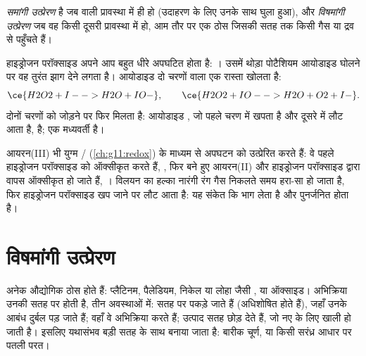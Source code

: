 \begin{definition}[समांगी और विषमांगी उत्प्रेरण]\label{def:g12:catalysis:homogeneous}
 \emph{समांगी उत्प्रेरण} है
जब   वाली प्रावस्था में ही हो (उदाहरण के लिए
उनके साथ घुला हुआ), और \emph{विषमांगी उत्प्रेरण}
जब वह किसी दूसरी प्रावस्था में हो, आम तौर पर एक ठोस जिसकी सतह तक
 किसी गैस या द्रव से पहुँचते हैं।
\end{definition}

\begin{example}[आयोडाइड आयन और हाइड्रोजन परॉक्साइड]\label{ex:g12:catalysis:iodide}
हाइड्रोजन परॉक्साइड अपने आप बहुत धीरे अपघटित होता है:
। उसमें थोड़ा पोटैशियम आयोडाइड घोलने पर
वह तुरंत झाग देने लगता है। आयोडाइड  दो चरणों वाला एक रास्ता खोलता है:
\[
  \ce{H2O2 + I- -> H2O + IO-}, \qquad
  \ce{H2O2 + IO- -> H2O + O2 + I-} .
\]
दोनों चरणों को जोड़ने पर फिर  मिलता है: आयोडाइड ,
जो पहले चरण में खपता है और दूसरे में लौट आता है,  है;
  एक मध्यवर्ती है।
\end{example}


\begin{example}\label{ex:g12:catalysis:iron}
आयरन(III)  भी युग्म
/ (\cref{ch:g11:redox}) के माध्यम से अपघटन को उत्प्रेरित करते हैं: वे पहले
हाइड्रोजन परॉक्साइड को ऑक्सीकृत करते हैं, , फिर
बने हुए आयरन(II)  और हाइड्रोजन परॉक्साइड द्वारा वापस ऑक्सीकृत हो जाते हैं,
। विलयन का हल्का नारंगी रंग
गैस निकलते समय हरा-सा हो जाता है, फिर हाइड्रोजन परॉक्साइड खप जाने पर
लौट आता है: यह संकेत कि  भाग लेता है
और पुनर्जनित होता है।
\end{example}

\section{विषमांगी उत्प्रेरण}

अनेक औद्योगिक  ठोस होते हैं: प्लैटिनम, पैलेडियम,
निकेल या लोहा जैसी , या ऑक्साइड। अभिक्रिया उनकी सतह पर होती है,
तीन अवस्थाओं में:   सतह पर पकड़े जाते हैं
(अधिशोषित होते हैं), जहाँ उनके आबंध दुर्बल पड़ जाते हैं; वहाँ वे अभिक्रिया करते हैं;
उत्पाद सतह छोड़ देते हैं, जो नए  के लिए खाली हो जाती है। इसलिए 
यथासंभव बड़ी सतह के साथ बनाया जाता है: बारीक चूर्ण, या किसी
सरंध्र आधार पर पतली परत।


